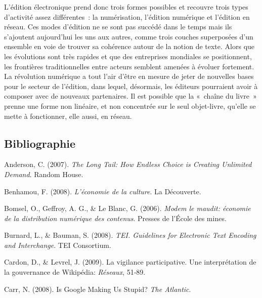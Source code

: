 \documentclass[12pt,french,letterpaper,]{article}
\begin{document}
L'édition électronique prend donc trois formes possibles et recouvre
trois types d'activité assez différentes~: la numérisation, l'édition
numérique et l'édition en réseau. Ces modes d'édition ne se sont pas
succédé dans le temps mais ils s'ajoutent aujourd'hui les uns aux
autres, comme trois couches superposées d'un ensemble en voie de trouver
sa cohérence autour de la notion de texte. Alors que les évolutions sont
très rapides et que des entreprises mondiales se positionnent, les
frontières traditionnelles entre acteurs semblent amenées à évoluer
fortement. La révolution numérique a tout l'air d'être en mesure de
jeter de nouvelles bases pour le secteur de l'édition, dans lequel,
désormais, les éditeurs pourraient avoir à composer avec de nouveaux
partenaires. Il est possible que la «~chaîne du livre~» prenne une forme
non linéaire, et non concentrée sur le seul objet-livre, qu'elle se
mette à fonctionner, elle aussi, en réseau.

\hypertarget{bibliographie}{%
\subsection*{Bibliographie}\label{bibliographie}}

\hypertarget{refs}{}
\leavevmode{}%
Anderson, C. (2007). \emph{The {Long} {Tail}: {How} {Endless} {Choice}
is {Creating} {Unlimited} {Demand}}. Random House.

\leavevmode{}%
Benhamou, F. (2008). \emph{L'économie de la culture}. La Découverte.

\leavevmode{}%
Bomsel, O., Geffroy, A. G., \& Le Blanc, G. (2006). \emph{Modem le
maudit: économie de la distribution numérique des contenus}. Presses de
l'École des mines.

\leavevmode{}%
Burnard, L., \& Bauman, S. (2008). \emph{{TEI}. {Guidelines} for
{Electronic} {Text} {Encoding} and {Interchange}}. TEI Consortium.

\leavevmode{}%
Cardon, D., \& Levrel, J. (2009). La vigilance participative. {Une}
interprétation de la gouvernance de {Wikipédia}: \emph{Réseaux}, 51‑89.

\leavevmode{}%
Carr, N. (2008). Is {Google} {Making} {Us} {Stupid}? \emph{The
Atlantic}.
\end{document}
